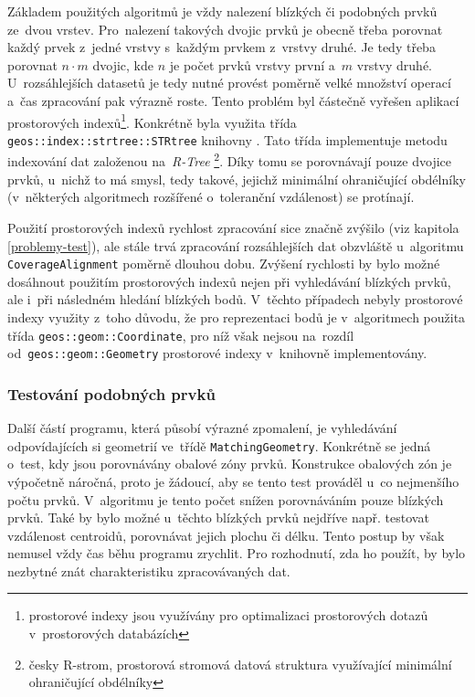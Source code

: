 Základem použitých algoritmů je vždy nalezení blízkých či podobných prvků 
ze~dvou vrstev. Pro~nalezení takových dvojic prvků je obecně třeba porovnat 
každý prvek z~jedné vrstvy s~každým prvkem z~vrstvy druhé. Je tedy třeba 
porovnat $n\cdot m$ dvojic, kde $n$ je počet prvků vrstvy první a~$m$ vrstvy 
druhé. U~rozsáhlejších datasetů je tedy nutné provést poměrně velké množství 
operací a~čas zpracování pak výrazně roste. Tento problém byl částečně vyřešen 
aplikací prostorových indexů\footnote{prostorové indexy jsou využívány pro 
optimalizaci prostorových dotazů v~prostorových databázích}. Konkrétně byla 
využita třída \texttt{geos::index::strtree::STRtree} knihovny  .
Tato třída implementuje metodu indexování dat založenou na~\textit{R-Tree}
\footnote{česky R-strom, prostorová stromová datová struktura využívající 
minimální ohraničující obdélníky}. Díky tomu se porovnávají pouze dvojice prvků, 
u~nichž to má smysl, tedy takové, jejichž minimální ohraničující obdélníky 
(v~některých algoritmech rozšířené o~toleranční vzdálenost) se protínají. 

Použití prostorových indexů rychlost zpracování sice značně zvýšilo (viz 
kapitola \ref{problemy-test}), ale stále trvá zpracování rozsáhlejších dat 
obzvláště u~algoritmu \linebreak[5] \texttt{Coverage\-Alignment} poměrně 
dlouhou dobu. Zvýšení rychlosti by bylo možné dosáhnout použitím prostorových 
indexů nejen při vyhledávání blízkých prvků, ale i~při následném hledání 
blízkých bodů. V~těchto případech nebyly prostorové indexy využity z~toho 
důvodu, že pro reprezentaci bodů je v~algoritmech použita třída 
\texttt{geos::geom::Coordinate}, pro níž však nejsou na~rozdíl 
od~\texttt{geos::geom::Geometry} prostorové indexy v~knihovně  
implementovány.


\subsubsection{Testování podobných prvků}

Další částí programu, která působí výrazné zpomalení, je vyhledávání
odpovídajících si geometrií ve~třídě \texttt{MatchingGeometry}. Konkrétně
se jedná o~test, kdy jsou porovnávány obalové zóny prvků. Konstrukce
obalových zón je výpočetně náročná, proto je žádoucí, aby se tento test
prováděl u~co nejmenšího počtu prvků. V~algoritmu je tento počet snížen
porovnáváním pouze blízkých prvků. Také by bylo možné u~těchto 
blízkých prvků nejdříve např. testovat vzdálenost centroidů, porovnávat
jejich plochu či délku. Tento postup by však nemusel vždy čas běhu programu
zrychlit. Pro rozhodnutí, zda ho použít, by bylo nezbytné znát charakteristiku
zpracovávaných dat.



